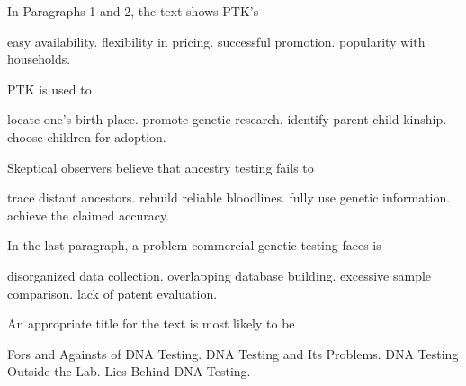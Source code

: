 \item In Paragraphs 1 and 2, the text shows PTK's
\begin{tasks}
	\task easy availability.
	\task flexibility in pricing.
	\task successful promotion.
	\task popularity with households.
\end{tasks}
\item PTK is used to
\begin{tasks}
	\task locate one's birth place.
	\task promote genetic research.
	\task identify parent-child kinship.
	\task choose children for adoption.
\end{tasks}
\item Skeptical observers believe that ancestry testing fails to
\begin{tasks}
	\task trace distant ancestors.
	\task rebuild reliable bloodlines.
	\task fully use genetic information.
	\task achieve the claimed accuracy.
\end{tasks}
\item In the last paragraph, a problem commercial genetic testing faces is
\begin{tasks}
	\task disorganized data collection.
	\task overlapping database building.
	\task excessive sample comparison.
	\task lack of patent evaluation.
\end{tasks}
\item An appropriate title for the text is most likely to be
\begin{tasks}
	\task Fors and Againsts of DNA Testing.
	\task DNA Testing and Its Problems.
	\task DNA Testing Outside the Lab.
	\task Lies Behind DNA Testing.
\end{tasks}